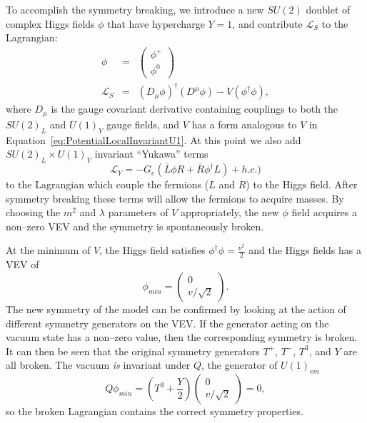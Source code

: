 To accomplish the symmetry breaking, we introduce a new $SU(2)$ doublet of
complex Higgs fields $\phi$ that have hypercharge $Y = 1$, and contribute
$\mathcal{L}_S$ to the Lagrangian:
\begin{eqnarray}
  \phi &=& \left(\begin{array}{c}\phi^+ \\ \phi^0\end{array}\right) \\
  \mathcal{L}_S &=& (D_\mu \phi)^\dag(D^\mu \phi) - V(\phi^\dag\phi),
\end{eqnarray}
where $D_\mu$ is the gauge covariant derivative containing couplings to both the
$SU(2)_L$ and $U(1)_Y$ gauge fields, and $V$ has a form analogous to $V$ in
Equation~\ref{eq:PotentialLocalInvariantU1}.  At this point we also add $SU(2)_L
\times U(1)_Y$ invariant ``Yukawa'' terms 
\begin{equation}
  \mathcal{L}_Y = -G_e(\overline L \phi R + \overline R \phi^\dag L) + h.c.)
  \label{eq:YukawaTerms}
\end{equation}
to the Lagrangian which couple the fermions ($L$ and $R$) to the Higgs field.
After symmetry breaking these terms will allow the fermions to acquire masses.
By choosing the $m^2$ and $\lambda$ parameters of $V$ appropriately, the new
$\phi$ field acquires a non--zero VEV and the symmetry is spontaneously broken.

At the minimum of $V$, the Higgs field satisfies $\phi^\dag\phi =
\frac{\nu^2}{2}$ and the Higgs fields has a VEV of
\begin{equation}
  \phi_{min} = \left(\begin{array}{c} 0 \\ v/\sqrt{2} \end{array}\right).
\end{equation}
The new symmetry of the model can be confirmed by looking at the action of
different symmetry generators on the VEV\@.  If the generator acting on the
vacuum state has a non--zero value, then the corresponding symmetry is broken.
It can then be seen that the original symmetry generators $T^+$, $T^-$, $T^3$,
and $Y$ are all broken.  The vacuum \emph{is} invariant under $Q$, the generator
of $U(1)_{em}$
\begin{equation}
  Q\phi_{min} = (T^3 + \frac{Y}{2})\left(\begin{array}{c} 0 \\ v/\sqrt{2}
  \end{array}\right) = 0 \nonumber,
\end{equation}
so the broken Lagrangian contains the correct symmetry properties.

